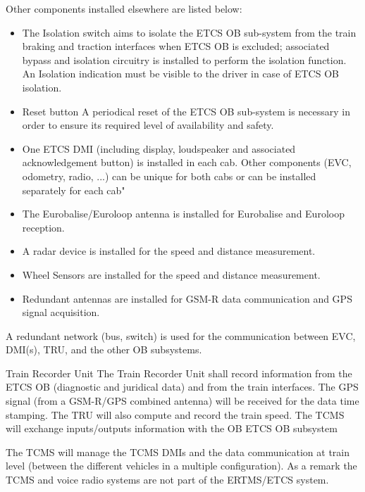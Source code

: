 \documentclass[oneside]{template/openetcs_report}
\begin{document}
Other components installed elsewhere are listed below:
\begin{itemize}
\item  The Isolation switch aims to isolate the ETCS OB sub-system from the train braking and traction interfaces when
ETCS OB is excluded; associated bypass and isolation circuitry is installed to perform the isolation function.
An Isolation indication must be visible to the driver in case of ETCS OB isolation.

\item Reset button
A periodical reset of the ETCS OB sub-system is necessary in order to ensure its required level of availability and safety.

\item One ETCS \gls{DMI}  (including display, loudspeaker and associated acknowledgement button) is installed in each cab. Other components (\gls{EVC}, odometry, radio, ...) can be unique for both cabs or can be installed separately for each cab"


\item The Eurobalise/Euroloop antenna is installed for Eurobalise and Euroloop reception.

\item A radar device is installed for the speed and distance measurement.

\item Wheel Sensors are installed for the speed and distance measurement.

\item Redundant antennas are installed for GSM-R data communication and GPS signal acquisition.
\end{itemize}

A redundant network (bus, switch) is used for the communication between \gls{EVC}, \gls{DMI}(s), \gls{TRU}, and the other OB subsystems.

Train Recorder Unit
The Train Recorder Unit shall record information from the ETCS OB (diagnostic and juridical data) and from the train interfaces. The GPS signal (from a GSM-R/GPS combined antenna) will be received for the data time stamping. 
The TRU will also compute and record the train speed. 
The \Gls{TCMS}  will exchange inputs/outputs information with the \Gls{OB} ETCS OB subsystem

The \gls{TCMS} will manage the \gls{TCMS} \gls{DMI}s and the data communication at train level (between the different vehicles in a multiple configuration). As a remark the \gls{TCMS} and voice radio systems are not part of the ERTMS/ETCS system.
\end{document}
